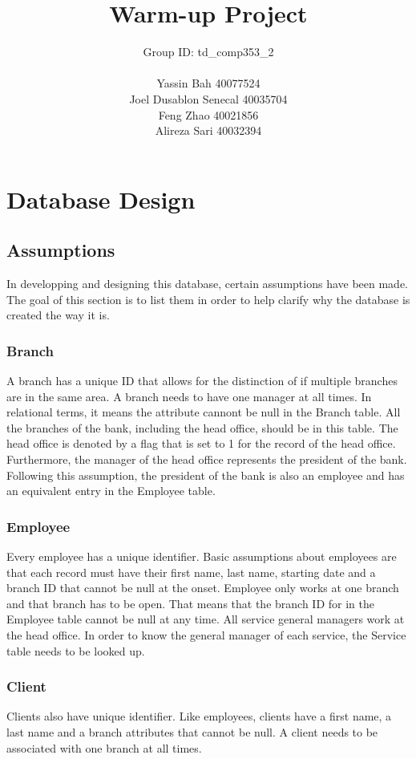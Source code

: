 \documentclass[letterpaper, 12pt]{article}
\title{
  Warm-up Project
  \vspace*{6em}
}
\author{
  Group ID: td\_comp353\_2\\\\
  Yassin Bah 40077524\\
  Joel Dusablon Senecal 40035704\\
  Feng Zhao 40021856\\
  Alireza Sari 40032394\\ \vspace*{5em}
}
\begin{document}
\maketitle
\newpage


\section{Database Design}
\subsection{Assumptions}
In developping and designing this database, certain assumptions have been made.
The goal of this section is to list them in order to help clarify why the database is created the way it is.

\subsubsection{Branch}
A branch has a unique ID that allows for the distinction of if multiple branches are in the same area.
A branch needs to have one manager at all times.
In relational terms, it means the attribute cannont be null in the Branch table.
All the branches of the bank, including the head office, should be in this table.
The head office is denoted by a flag that is set to 1 for the record of the head office.
Furthermore, the manager of the head office represents the president of the bank.
Following this assumption, the president of the bank is also an employee and has an equivalent entry in the Employee table.

\subsubsection{Employee}
Every employee has a unique identifier.
Basic assumptions about employees are that each record must have their first name, last name, starting date and a branch ID that cannot be null at the onset.
Employee only works at one branch and that branch has to be open.
That means that the branch ID for in the Employee table cannot be null at any time.
All service general managers work at the head office.
In order to know the general manager of each service, the Service table needs to be looked up.

\subsubsection{Client}
Clients also have unique identifier.
Like employees, clients have a first name, a last name and a branch attributes that cannot be null.
A client needs to be associated with one branch at all times.
\end{document}
